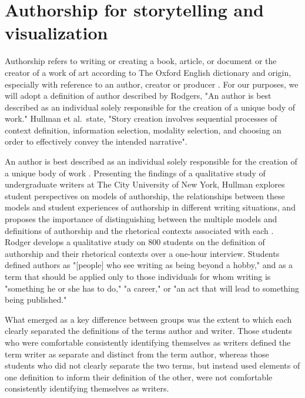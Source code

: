 \documentclass{egpubl}
\begin{document}
\section{Authorship for storytelling and visualization}
Authorship refers to writing or creating a book, article, or document or the creator of a work of art according to The Oxford English dictionary\cite{authoship2} and origin, especially with reference to an author, creator or producer \cite{authoship1}. For our purposes, we will adopt a definition of author described by Rodgers\cite{rodgers2011}, "An author is best described as an individual solely responsible for the creation of a unique body of work."  Hullman \cite{hullman2013deeper} et al.\ state, "Story creation involves sequential processes of context definition, information selection, modality selection, and choosing an order to effectively convey the intended narrative".

An author is best described as an individual solely responsible for the creation of a unique body of work \cite{rodgers2011}.
 Presenting the findings of a qualitative study of undergraduate writers at The City University of New York, Hullman explores student perspectives on models of authorship, the relationships between these models and student experiences of authorship in different writing situations, and proposes the importance of distinguishing between the multiple models and definitions of authorship and the rhetorical contexts associated with each \cite{rodgers2011}.
Rodger develops a qualitative study on 800 students on the definition of authorship and their rhetorical contexts over a one-hour interview.
Students defined authors as "[people] who see writing as being beyond a hobby," and as a term that should be applied only to those
individuals for whom writing is "something he or she has to do," "a career," or "an act that will lead to something being published." 

What emerged as a key difference between groups was the extent to which each clearly separated the definitions of the terms author and writer. Those students who were comfortable consistently identifying themselves as writers defined the term writer as separate and distinct from the term author, whereas those students who did not clearly separate the two terms, but instead used elements of one definition to inform their definition of the other, were not comfortable consistently identifying themselves as writers.
\end{document}
